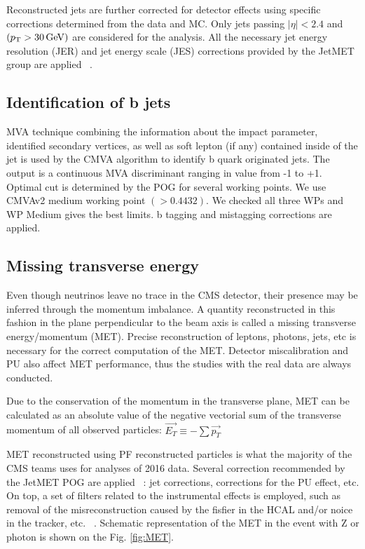     Reconstructed jets are further corrected for detector effects using specific corrections determined from the data and MC. Only jets passing $|\eta|<2.4$ and  $(p_{\mathrm{T}} > 30\,\text{Ge\hspace{-.08em}V})$ are considered for the analysis. 
    All the necessary jet energy resolution (JER) and jet energy scale (JES) corrections provided by the JetMET group are applied ~\cite{JetMETgroup}.


\subsection{Identification of b jets\label{sec:bjets}}
MVA technique combining the information about the impact parameter, identified secondary vertices, as well as soft lepton (if any) contained inside of the jet is used by the CMVA algorithm to identify b quark originated jets. The output is a continuous MVA discriminant ranging in value from -1 to +1. Optimal cut is determined by the POG for several working points. We use CMVAv2 medium working point  $(>0.4432)$. We checked all three WPs and WP Medium gives the best limits. b tagging and mistagging corrections are applied.



\subsection{Missing transverse energy}\label{sec:MET}
Even though neutrinos leave no trace in the CMS detector, their presence may be inferred through the momentum imbalance. A quantity reconstructed in this fashion in the plane perpendicular to the beam axis is called a missing transverse energy/momentum (MET). Precise reconstruction of leptons, photons, jets, etc is necessary for the correct computation of the MET. Detector miscalibration and PU also affect MET performance, thus the studies with the real data are always conducted.   

Due to the conservation of the momentum in the transverse plane, MET can be calculated as an absolute value of the negative vectorial sum of the transverse momentum of all observed particles:  
$\overrightarrow{E_T} \equiv -\sum \overrightarrow{p_T}$

MET reconstructed using PF reconstructed particles \cite{PF_MET} is what the majority of the CMS teams uses for analyses of 2016 data.  
Several correction recommended by the JetMET POG are applied ~\cite{MissingETRun2Corrections}: jet corrections, corrections for the PU effect, etc. On top, a set of filters related to the instrumental effects is employed, such as removal of the misreconstruction caused by the fisfier in the HCAL and/or noice in the tracker, etc.  ~\cite{MissingETOptionalFiltersRun2}. Schematic representation of the MET in the event with Z or photon is shown on the Fig. \ref{fig:MET}.

